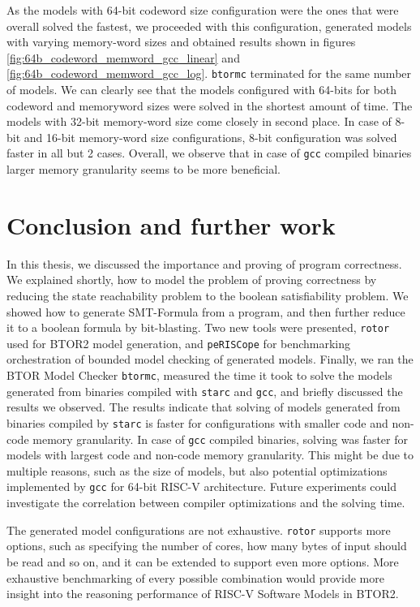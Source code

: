 \documentclass[12pt]{article}
\begin{document}
As the models with 64-bit codeword size configuration were the ones that were
overall solved the fastest, we proceeded with this configuration, generated
models with varying memory-word sizes and obtained results shown in figures
\ref{fig:64b_codeword_memword_gcc_linear} and
\ref{fig:64b_codeword_memword_gcc_log}. \texttt{btormc} terminated for the same
number of models. We can clearly see that the models configured with 64-bits
for both codeword and memoryword sizes were solved in the shortest amount of
time. The models with 32-bit memory-word size come closely in second place. In
case of 8-bit and 16-bit memory-word size configurations, 8-bit configuration
was solved faster in all but 2 cases. Overall, we observe that in case of
\texttt{gcc} compiled binaries larger memory granularity seems to be more
beneficial.

\section{Conclusion and further work}

In this thesis, we discussed the importance and proving of program correctness.
We explained shortly, how to model the problem of proving correctness by
reducing the state reachability problem to the boolean satisfiability problem.
We showed how to generate SMT-Formula from a program, and then further reduce
it to a boolean formula by bit-blasting. Two new tools were presented,
\texttt{rotor} used for BTOR2 model generation, and \texttt{peRISCope} for
benchmarking orchestration of bounded model checking of generated models.
Finally, we ran the BTOR Model Checker \texttt{btormc}, measured the time it
took to solve the models generated from binaries compiled with \texttt{starc}
and \texttt{gcc}, and briefly discussed the results we observed. The results
indicate that solving of models generated from binaries compiled by
\texttt{starc} is faster for configurations with smaller code and non-code
memory granularity. In case of \texttt{gcc} compiled binaries, solving was
faster for models with largest code and non-code memory granularity. This might
be due to multiple reasons, such as the size of models, but also potential
optimizations implemented by \texttt{gcc} for 64-bit RISC-V architecture.
Future experiments could investigate the correlation between compiler
optimizations and the solving time.

The generated model configurations are not exhaustive. \texttt{rotor} supports
more options, such as specifying the number of cores, how many bytes of input
should be read and so on, and it can be extended to support even more options.
More exhaustive benchmarking of every possible combination would provide more
insight into the reasoning performance of RISC-V Software Models in BTOR2.
\end{document}
